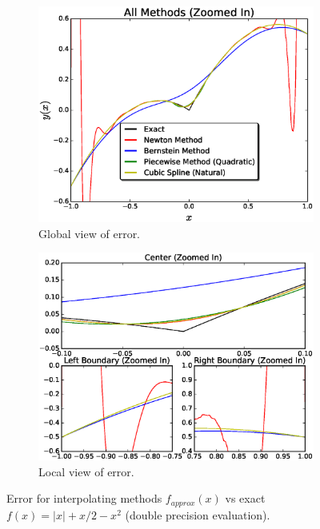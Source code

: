 \documentclass[12pt]{article}
\theoremstyle{remark}
\begin{document}
\begin{figure}[H]
	\centering
	\begin{subfigure}{.5\textwidth}
		\centering
		\includegraphics[width=1.1\linewidth]{Nfig3.eps}
		\caption{Global view of error.}
		\label{fig:sub1}
	\end{subfigure}%
	\begin{subfigure}{.5\textwidth}
		\centering
		\includegraphics[width=1.1\linewidth]{NsubFig3.eps}
		\caption{Local view of error.}
		\label{fig:sub2}
	\end{subfigure}
	\caption{Error for interpolating methods $f_{approx}(x)$ vs exact $f(x) = \vert x \vert + x/2 - x^2$ (double precision evaluation). }
	\label{fig:test}
\end{figure}
\end{document}
